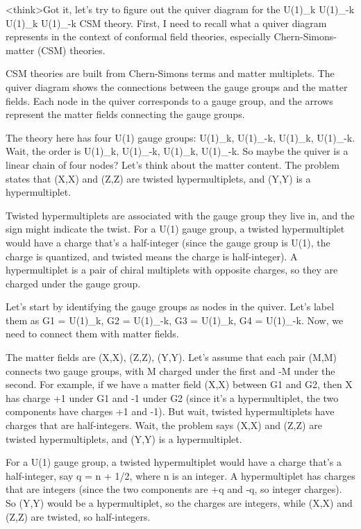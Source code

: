 <think>Got it, let's try to figure out the quiver diagram for the U(1)_k U(1)_-k U(1)_k U(1)_-k CSM theory. First, I need to recall what a quiver diagram represents in the context of conformal field theories, especially Chern-Simons-matter (CSM) theories. 

CSM theories are built from Chern-Simons terms and matter multiplets. The quiver diagram shows the connections between the gauge groups and the matter fields. Each node in the quiver corresponds to a gauge group, and the arrows represent the matter fields connecting the gauge groups. 

The theory here has four U(1) gauge groups: U(1)_k, U(1)_-k, U(1)_k, U(1)_-k. Wait, the order is U(1)_k, U(1)_-k, U(1)_k, U(1)_-k. So maybe the quiver is a linear chain of four nodes? Let's think about the matter content. The problem states that (X,X) and (Z,Z) are twisted hypermultiplets, and (Y,Y) is a hypermultiplet. 

Twisted hypermultiplets are associated with the gauge group they live in, and the sign might indicate the twist. For a U(1) gauge group, a twisted hypermultiplet would have a charge that's a half-integer (since the gauge group is U(1), the charge is quantized, and twisted means the charge is half-integer). A hypermultiplet is a pair of chiral multiplets with opposite charges, so they are charged under the gauge group. 

Let's start by identifying the gauge groups as nodes in the quiver. Let's label them as G1 = U(1)_k, G2 = U(1)_-k, G3 = U(1)_k, G4 = U(1)_-k. Now, we need to connect them with matter fields. 

The matter fields are (X,X), (Z,Z), (Y,Y). Let's assume that each pair (M,M) connects two gauge groups, with M charged under the first and -M under the second. For example, if we have a matter field (X,X) between G1 and G2, then X has charge +1 under G1 and -1 under G2 (since it's a hypermultiplet, the two components have charges +1 and -1). But wait, twisted hypermultiplets have charges that are half-integers. Wait, the problem says (X,X) and (Z,Z) are twisted hypermultiplets, and (Y,Y) is a hypermultiplet. 

For a U(1) gauge group, a twisted hypermultiplet would have a charge that's a half-integer, say q = n + 1/2, where n is an integer. A hypermultiplet has charges that are integers (since the two components are +q and -q, so integer charges). So (Y,Y) would be a hypermultiplet, so the charges are integers, while (X,X) and (Z,Z) are twisted, so half-integers. 

